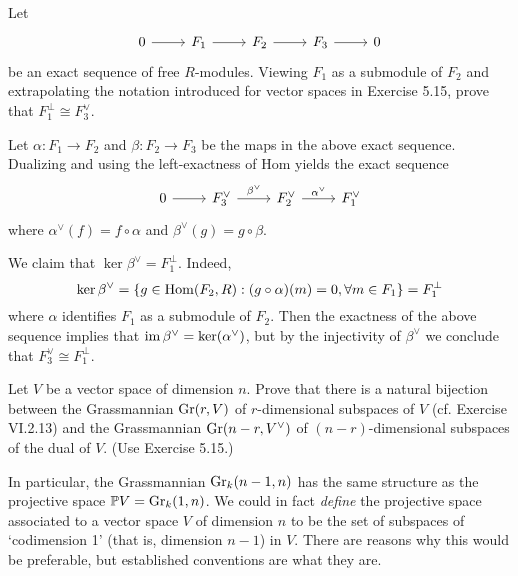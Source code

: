 \documentclass[../../master.tex]{subfiles}
\begin{document}
\begin{problem}
    Let
    \[
    \begin{tikzcd}
        0 & F_1 & F_2 & F_3 & 0
        \arrow[from=1-1, to=1-2]
        \arrow[from=1-2, to=1-3]
        \arrow[from=1-3, to=1-4]
        \arrow[from=1-4, to=1-5] 
    \end{tikzcd}
    \]
    be an exact sequence of free $R$-modules.
    Viewing $F_1$ as a submodule of $F_2$ and extrapolating the notation introduced for vector spaces in Exercise 5.15, prove that $F_1^{\perp} \cong F_3^{\vee}$.
\end{problem}

\begin{solution}
    Let $\alpha : F_1 \to F_2$ and $\beta : F_2 \to F_3$ be the maps in the above exact sequence.
    Dualizing and using the left-exactness of Hom yields the exact sequence
    \[
    \begin{tikzcd}
        0 & F_3^{\vee} & F_2^{\vee} & F_1^{\vee}
        \arrow[from=1-1, to=1-2]
        \arrow[from=1-2, to=1-3, "\beta^{\vee}"] 
        \arrow[from=1-3, to=1-4, "\alpha^{\vee}"] 
    \end{tikzcd}
    \]
    where $\alpha^{\vee}(f) = f \circ \alpha$ and $\beta^{\vee}(g) = g \circ \beta$.
    
    We claim that $\ker \beta^{\vee} = F_1^{\perp}$.
    Indeed, 
    \[
        \ker \beta^{\vee} = \{g \in \operatorname{Hom}(F_2, R) : (g \circ \alpha)(m) = 0, \forall m \in F_1\} = F_1^{\perp}
    \]
    where $\alpha$ identifies $F_1$ as a submodule of $F_2$.
    Then the exactness of the above sequence implies that $\operatorname{im} \beta^{\vee} = \ker(\alpha^{\vee})$, but by the injectivity of $\beta^{\vee}$ we conclude that $F_3^{\vee} \cong F_1^{\perp}$.
\end{solution}

\begin{problem}
    Let $V$ be a vector space of dimension $n$.
    Prove that there is a natural bijection between the Grassmannian $\operatorname{Gr}(r, V)$ of $r$-dimensional subspaces of $V$ (cf. Exercise VI.2.13) and the Grassmannian $\operatorname{Gr}(n-r, V^{\vee})$ of $(n-r)$-dimensional subspaces of the dual of $V$. 
    (Use Exercise 5.15.)

    In particular, the Grassmannian $\operatorname{Gr}_k(n-1, n)$ has the same structure as the projective space $\mathbb{P}V = \operatorname{Gr}_k(1, n)$.
    We could in fact \textit{define} the projective space associated to a vector space $V$ of dimension $n$ to be the set of subspaces of `codimension 1' (that is, dimension $n-1$) in $V$.
    There are reasons why this would be preferable, but established conventions are what they are.
\end{problem}
\end{document}

